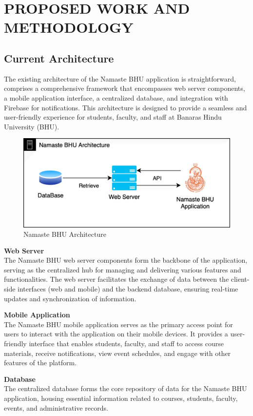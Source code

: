 \clearpage
\chapter{PROPOSED WORK AND METHODOLOGY}
\section{Current Architecture}
The existing architecture of the Namaste BHU application is straightforward, comprises a comprehensive framework that encompasses web server components, a mobile application interface, a centralized database, and integration with Firebase for notifications. This architecture is designed to provide a seamless and user-friendly experience for students, faculty, and staff at Banaras Hindu University (BHU).

\begin{figure}[h]
    \centering
    \includegraphics[width=0.75\linewidth]{assets/img/namaste-arch.jpg}
    \caption{Namaste BHU Architecture}
    \label{fig:namaste-arch}
\end{figure}

\textbf{Web Server}\\
The Namaste BHU web server components form the backbone of the application, serving as the centralized hub for managing and delivering various features and functionalities. The web server facilitates the exchange of data between the client-side interfaces (web and mobile) and the backend database, ensuring real-time updates and synchronization of information.

\textbf{Mobile Application}\\
The Namaste BHU mobile application serves as the primary access point for users to interact with the application on their mobile devices. It provides a user-friendly interface that enables students, faculty, and staff to access course materials, receive notifications, view event schedules, and engage with other features of the platform.

\textbf{Database}\\
The centralized database forms the core repository of data for the Namaste BHU application, housing essential information related to courses, students, faculty, events, and administrative records.

